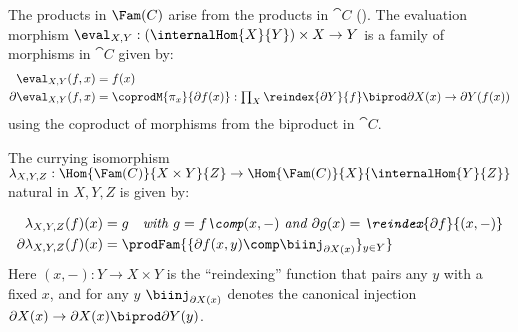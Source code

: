 The products in $\Fam(C)$ arise from the products in $\cat{C}$ ().
The evaluation morphism $\eval_{X,Y}: (\internalHom{X}{Y}) \times X \to Y$ is a family of morphisms in
$\cat{C}$ given by:
\begin{align*}
\eval_{X,Y}(f,x) &= f(x) \\
\partial\eval_{X,Y}(f,x) &= \coprodM{\pi_x}{\partial f(x)}
  : \textstyle\prod_{X}\reindex{\partial Y}{f} \biprod \partial X(x) \to \partial Y(f(x))
\end{align*}
\noindent using the coproduct of morphisms from the biproduct in $\cat{C}$.

The currying isomorphism $\lambda_{X,Y,Z}: \Hom{\Fam(C)}{X \times Y}{Z} \to
\Hom{\Fam(C)}{X}{\internalHom{Y}{Z}}$ natural in $X, Y, Z$ is given by:

\vspace{-4mm}
\begin{align*}
\lambda_{X,Y,Z}(f)(x) &= g \quad\textit{with $g = f \comp (x,-)$ and $\partial g(x) = \reindex{\partial f}{(x,-)}$} \\
\partial\lambda_{X,Y,Z}(f)(x) &= \prodFam{\{\partial f(x,y) \comp \biinj_{\partial X(x)}\}_{y \in Y}}
\end{align*}
\noindent Here $(x,-): Y \to X \times Y$ is the ``reindexing'' function that pairs any $y$ with a fixed $x$,
and for any $y$ $\biinj_{\partial X(x)}$ denotes the canonical injection $\partial X(x) \to \partial X(x)
\biprod \partial Y(y)$.

